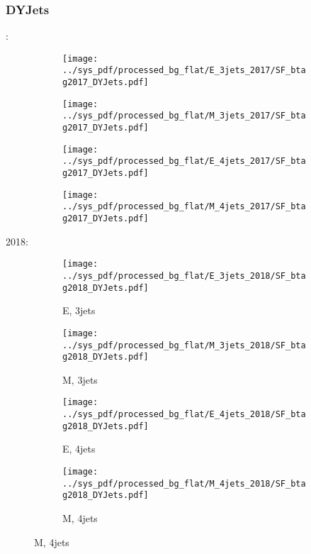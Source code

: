 \documentclass{beamer}
\begin{document}
\begin{frame}
\frametitle{DYJets}
\fontsize{5}{1}:
\begin{figure}
\centering
\begin{subfigure}[b]{0.24\textwidth}
\texttt{[image: ../sys\_pdf/processed\_bg\_flat/E\_3jets\_2017/SF\_btag2017\_DYJets.pdf]}
\end{subfigure}
\begin{subfigure}[b]{0.24\textwidth}
\texttt{[image: ../sys\_pdf/processed\_bg\_flat/M\_3jets\_2017/SF\_btag2017\_DYJets.pdf]}
\end{subfigure}
\begin{subfigure}[b]{0.24\textwidth}
\texttt{[image: ../sys\_pdf/processed\_bg\_flat/E\_4jets\_2017/SF\_btag2017\_DYJets.pdf]}
\end{subfigure}
\begin{subfigure}[b]{0.24\textwidth}
\texttt{[image: ../sys\_pdf/processed\_bg\_flat/M\_4jets\_2017/SF\_btag2017\_DYJets.pdf]}
\end{subfigure}
\end{figure}
2018:
\begin{figure}
\centering
\begin{subfigure}[b]{0.24\textwidth}
\texttt{[image: ../sys\_pdf/processed\_bg\_flat/E\_3jets\_2018/SF\_btag2018\_DYJets.pdf]}
\captionsetup{font=tiny}
\caption{E, 3jets}
\end{subfigure}
\begin{subfigure}[b]{0.24\textwidth}
\texttt{[image: ../sys\_pdf/processed\_bg\_flat/M\_3jets\_2018/SF\_btag2018\_DYJets.pdf]}
\captionsetup{font=tiny}
\caption{M, 3jets}
\end{subfigure}
\begin{subfigure}[b]{0.24\textwidth}
\texttt{[image: ../sys\_pdf/processed\_bg\_flat/E\_4jets\_2018/SF\_btag2018\_DYJets.pdf]}
\captionsetup{font=tiny}
\caption{E, 4jets}
\end{subfigure}
\begin{subfigure}[b]{0.24\textwidth}
\texttt{[image: ../sys\_pdf/processed\_bg\_flat/M\_4jets\_2018/SF\_btag2018\_DYJets.pdf]}
\captionsetup{font=tiny}
\caption{M, 4jets}
\end{subfigure}
\end{figure}
\end{frame}
\end{document}
